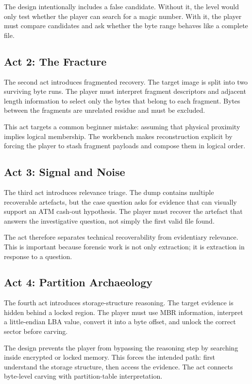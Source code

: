 \documentclass[11pt,a4paper]{article}
\begin{document}
The design intentionally includes a false candidate. Without it, the level would only test whether the player can search for a magic number. With it, the player must compare candidates and ask whether the byte range behaves like a complete file.

\subsection{Act 2: The Fracture}

The second act introduces fragmented recovery. The target image is split into two surviving byte runs. The player must interpret fragment descriptors and adjacent length information to select only the bytes that belong to each fragment. Bytes between the fragments are unrelated residue and must be excluded.

This act targets a common beginner mistake: assuming that physical proximity implies logical membership. The workbench makes reconstruction explicit by forcing the player to stash fragment payloads and compose them in logical order.

\subsection{Act 3: Signal and Noise}

The third act introduces relevance triage. The dump contains multiple recoverable artefacts, but the case question asks for evidence that can visually support an ATM cash-out hypothesis. The player must recover the artefact that answers the investigative question, not simply the first valid file found.

The act therefore separates technical recoverability from evidentiary relevance. This is important because forensic work is not only extraction; it is extraction in response to a question.

\subsection{Act 4: Partition Archaeology}

The fourth act introduces storage-structure reasoning. The target evidence is hidden behind a locked region. The player must use MBR information, interpret a little-endian LBA value, convert it into a byte offset, and unlock the correct sector before carving.

The design prevents the player from bypassing the reasoning step by searching inside encrypted or locked memory. This forces the intended path: first understand the storage structure, then access the evidence. The act connects byte-level carving with partition-table interpretation.
\end{document}
